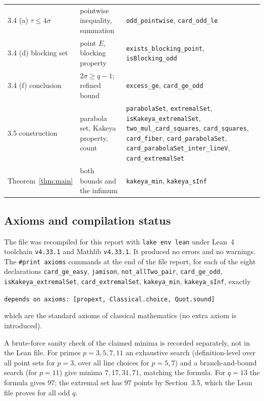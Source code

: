 \documentclass[11pt,a4paper]{article}
\theoremstyle{definition}
\theoremstyle{remark}
\begin{document}
{\begin{tabular}{@{}p{3.6cm}p{5.6cm}p{6.2cm}@{}}
3.4 (a) $\tau\le4\sigma$ & pointwise inequality, summation &
\texttt{odd\_pointwise}, \texttt{card\_odd\_le} \\
3.4 (d) blocking set & point $E$, blocking property &
\texttt{exists\_blocking\_point}, \texttt{isBlocking\_odd} \\
3.4 (f) conclusion & $2\sigma\ge q-1$; refined bound &
\texttt{excess\_ge}, \texttt{card\_ge\_odd} \\
3.5 construction & parabola set, Kakeya property, count &
\texttt{parabolaSet}, \texttt{extremalSet}, \texttt{isKakeya\_extremalSet}, \texttt{two\_mul\_card\_squares}, \texttt{card\_squares}, \texttt{card\_fiber}, \texttt{card\_parabolaSet}, \texttt{card\_parabolaSet\_inter\_lineV}, \texttt{card\_extremalSet} \\
Theorem~\ref{thm:main} & both bounds and the infimum &
\texttt{kakeya\_min}, \texttt{kakeya\_sInf} \\
\bottomrule
\end{tabular}}

\subsection{Axioms and compilation status}

The file was recompiled for this report with \texttt{lake env lean} under Lean~4 toolchain
\texttt{v4.33.1} and Mathlib \texttt{v4.33.1}. It produced no errors and no warnings. The
\texttt{\#print axioms} commands at the end of the file report, for each of the eight declarations
\texttt{card\_ge\_easy}, \texttt{jamison}, \texttt{not\_allTwo\_pair}, \texttt{card\_ge\_odd},
\texttt{isKakeya\_extremalSet}, \texttt{card\_extremalSet}, \texttt{kakeya\_min}, \texttt{kakeya\_sInf}, exactly

\begin{center}
\texttt{depends on axioms: [propext, Classical.choice, Quot.sound]}
\end{center}

\noindent
which are the standard axioms of classical mathematics (no extra axiom is introduced).

A brute-force sanity check of the claimed minima is recorded separately, not in the Lean file. For
primes $p=3,5,7,11$ an exhaustive search (definition-level over all point sets for $p=3$,
over all line choices for $p=5,7$) and a branch-and-bound search (for $p=11$) give minima
$7,17,31,71$, matching the formula. For $q=13$ the formula gives $97$; the extremal set has $97$ points
by Section~3.5, which the Lean file proves for all odd $q$.
\end{document}
